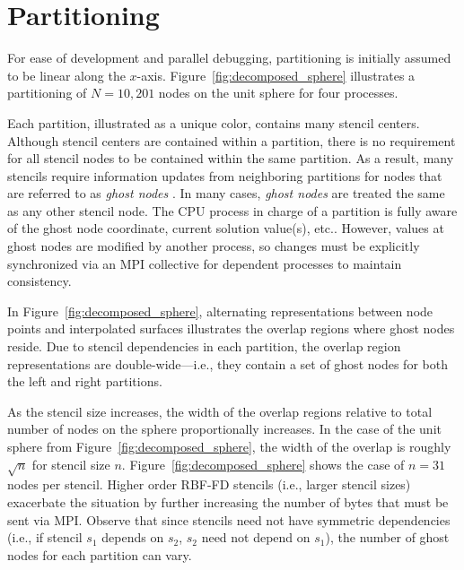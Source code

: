 \documentclass{report}
\begin{document}
\section{Partitioning}

For ease of development and parallel debugging, partitioning is initially
assumed to be linear along the $x$-axis. Figure~\ref{fig:decomposed_sphere} illustrates a partitioning of
$N=10,201$ nodes on the unit sphere for four processes. 

Each partition, illustrated as a unique color, contains many stencil centers. 
Although stencil centers are contained within a partition, there is no requirement for all stencil nodes to be contained within the same partition. As a result, many stencils require information updates from neighboring partitions for nodes that are referred to as \emph{ghost nodes} \cite{NeEDREF}. %
In many cases, \emph{ghost nodes} are treated the same as any other stencil node. The CPU process in charge of a partition is fully aware of the ghost node coordinate, current solution value(s), etc.. However, values at ghost nodes are modified by another process, so changes must be explicitly synchronized via an MPI collective for dependent processes to maintain consistency. 

In Figure~\ref{fig:decomposed_sphere}, alternating representations between node points and interpolated surfaces illustrates the
overlap regions where ghost nodes reside. Due to stencil dependencies in each partition, the overlap region representations are double-wide---i.e., they contain a set of ghost nodes for both the left and right partitions. 

As the stencil size increases, the width of the
overlap regions relative to total number of nodes on the sphere proportionally increases. In the case of the unit sphere from Figure~\ref{fig:decomposed_sphere}, the width of the overlap is roughly $\sqrt{n}$ for stencil size $n$. Figure~\ref{fig:decomposed_sphere} shows the case of $n=31$ nodes per stencil. Higher order RBF-FD stencils (i.e., larger stencil sizes) exacerbate the situation by further increasing the number of bytes that must be sent via MPI. Observe that since stencils need not have symmetric dependencies (i.e., if stencil $s_1$ depends on $s_2$, $s_2$ need not depend on $s_1$), the number of ghost nodes for each partition can vary.
\end{document}
